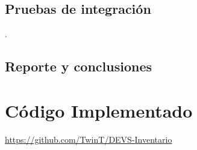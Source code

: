 \documentclass[10pt]{article}
\begin{document}
\subsection{Pruebas de integración}
.
\subsection{Reporte y conclusiones}


\appendix
\section{Código Implementado}

\url{https://github.com/TwinT/DEVS-Inventario}



\end{document}
